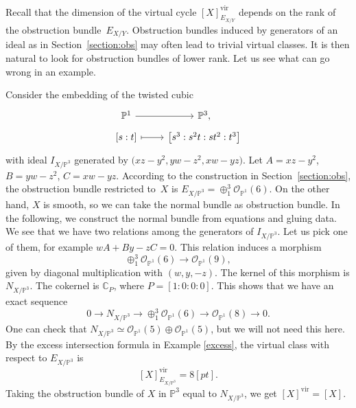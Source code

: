 \documentclass[pdftex]{sigma}
\numberwithin{equation}{section}
\newcommand{\vv}{\mathrm{vir}}
\newcommand{\PP}{\mathbb P}
\theoremstyle{plain}
\theoremstyle{definition}
\theoremstyle{remark}
\begin{document}
Recall that the dimension of the virtual cycle $[X]_{E_{X/Y}}^{\vv}$ depends on the rank of the obstruction bundle~$E_{X/Y}$. Obstruction bundles induced by generators of an ideal as in Section~\ref{section:obs} may often lead to trivial virtual classes. It is then natural to look for obstruction bundles of lower rank. Let us see what can go wrong in an example.
\begin{Example}
Consider the embedding of the twisted cubic
\[
 \begin{tikzcd}[row sep=tiny]
 \mathbb P^1\ar[r] & \mathbb P^3, \\
 \left[s:t\right]\ar[r, mapsto] & \big[s^3:s^2t:st^2:t^3\big]
 \end{tikzcd}
\]
with ideal $I_{X/\PP^3}$ generated by $\big(xz-y^2,yw-z^2,xw-yz\big)$. Let $A=xz-y^2$, $B=yw-z^2$, $C=xw-yz$. According to the construction in Section~\ref{section:obs}, the obstruction bundle restricted to~$X$ is $E_{X/\PP^3}=\oplus_1^3 \mathcal O_{\PP^1}(6)$. On the other hand, $X$ is smooth, so we can take the normal bundle as obstruction bundle. In the following, we construct the normal bundle from equations and gluing data. We see that we have two relations among the generators of $I_{X/\PP^3}$. Let us pick one of them, for example $wA+By-zC=0$. This relation induces a morphism
\[ \oplus_1^3 \mathcal O_{\PP^1}(6)\to \mathcal O_{\PP^1}(9),
\]
given by diagonal multiplication with $(w,y,-z)$. The kernel of this morphism is $N_{X/\PP^3}$. The cokernel is $\mathbb{C}_P$, where $P=[1:0:0:0]$. This shows that we have an exact sequence
\[
0\to N_{X/\PP^3}\to \oplus_1^3 \mathcal O_{\PP^1}(6)\to \mathcal O_{\PP^1}(8)\to 0.
\]
One can check that $N_{X/\PP^3}\simeq \mathcal O_{\PP^1}(5)\oplus\mathcal O_{\PP^1}(5)$, but we will not need this here. By the excess intersection formula in Example \ref{excess}, the virtual class with respect to $E_{X/\PP^3}$ is
 \[
 [X]^{\vv}_{E_{X/\PP^3}}=8[pt].
 \]
 Taking the obstruction bundle of $X$ in $\PP^3$ equal to $N_{X/\PP^3}$, we get $[X]^{\vv}=[X]$.
\end{Example}
\end{document}
